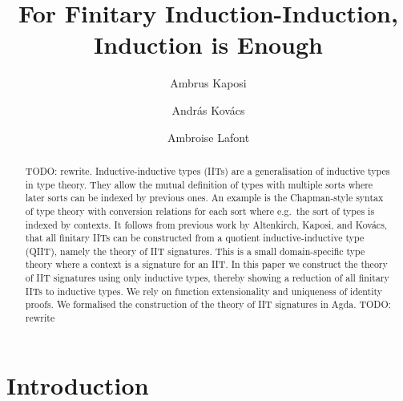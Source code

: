 \documentclass[a4paper,UKenglish,cleveref, autoref]{lipics-v2019}
\title{For Finitary Induction-Induction, \\ Induction is Enough} %
\author{Ambrus Kaposi}{E{\"o}tv{\"o}s Lor{\'a}nd University, Budapest, Hungary}{akaposi@inf.elte.hu}{https://orcid.org/0000-0001-9897-8936}{this author was supported by the National Research,
Development and Innovation Fund of Hungary, financed under the
Thematic Excellence Programme funding scheme, Project
no.\ ED18-1-2019-0030 (Application-specific highly reliable IT
solutions), by the New National Excellence Program of the Ministry
for Innovation and Technology, Project no.\ ÚNKP-19-4-ELTE-874, and
by the Bolyai Fellowship of the Hungarian Academy of Sciences,
Project no.\ BO/00659/19/3.}%
\author{Andr{\'a}s Kov{\'a}cs}{E{\"o}tv{\"o}s Lor{\'a}nd University, Budapest, Hungary}{kovacsandras@inf.elte.hu}{https://orcid.org/0000-0002-6375-9781}{this author was supported by the European Union, co-financed by the European Social Fund (EFOP-3.6.3-VEKOP-16-2017-00002).}
\author{Ambroise Lafont}{IMT Atlantique, Inria, LS2N CNRS, Nantes, France}{ambroise.lafont@inria.fr}{https://orcid.org/0000-0002-9299-641X}{}
\begin{document}
\maketitle

\begin{abstract}
  TODO: rewrite. Inductive-inductive types (IITs) are a generalisation of inductive types in
  type theory. They allow the mutual definition of types with multiple sorts
  where later sorts can be indexed by previous ones. An example is the
  Chapman-style syntax of type theory with conversion relations for each sort
  where e.g.\ the sort of types is indexed by contexts. It follows from previous
  work by Altenkirch, Kaposi, and Kov{\'a}cs, that all finitary IITs can be constructed from a quotient
  inductive-inductive type (QIIT), namely the theory of IIT signatures. This is
  a small domain-specific type theory where a context is a signature for an
  IIT. In this paper we construct the theory of IIT signatures using only inductive types,
  thereby showing a reduction of all finitary IITs to inductive types.  We rely
  on function extensionality and uniqueness of identity proofs. We formalised
  the construction of the theory of IIT signatures in Agda. TODO: rewrite
\end{abstract}


\section{Introduction}
\label{sec:intro}
\end{document}
